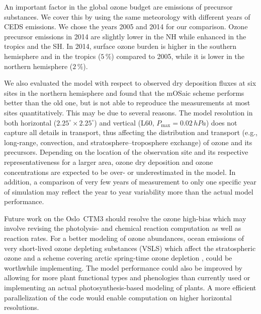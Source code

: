 \documentclass[gmd, manuscript]{copernicus}
\begin{document}

An important factor in the global ozone budget are emissions of precursor substances. We cover this by using the same meteorology with different years of CEDS emissions. We chose the years 2005 and 2014 for our comparison. Ozone precursor emissions in 2014 are slightly lower in the NH while enhanced in the tropics and the SH. In 2014, surface ozone burden is higher in the southern hemisphere and in the tropics ($5\,\unit{\%}$) compared to 2005, while it is lower in the northern hemisphere ($2\,\unit{\%}$).

We also evaluated the model with respect to observed dry deposition fluxes at six sites in the northern hemisphere and found that the mOSaic scheme performs better than the old one, but is not able to reproduce the measurements at most sites quantitatively. This may be due to several reasons. The model resolution in both horizontal ($2.25^\circ\times 2.25^\circ$) and vertical (L60, $P_\text{max}=0.02\,\unit{hPa}$) does not capture all details in transport, thus affecting the distribution and transport (e.g., long-range, convection, and stratosphere--troposphere exchange) of ozone and its precursors. Depending on the location of the observation site and its respective representativeness for a larger area, ozone dry deposition and ozone concentrations are expected to be over- or underestimated in the model. In addition, a comparison of very few years of measurement to only one specific year of simulation may reflect the year to year variability more than the actual model performance.

Future work on the Oslo~CTM3 should resolve the ozone high-bias which may involve revising the photolysis- and chemical reaction computation as well as reaction rates. For a better modeling of ozone abundances, ocean emissions of very short-lived ozone depleting substances (VSLS) \citep{JGR:Warwick2006, ACP:Ziska2013, ACP:Hossaini2016, ACP:Falk2017} which affect the stratospheric ozone and a scheme covering arctic spring-time ozone depletion \citep[e.g.,][]{ACP:Yang2010, ACP:Toyota2011, GMD:Falk2018}, could be worthwhile implementing. The model performance could also be improved by allowing for more plant functional types and phenologies than currently used or implementing an actual photosynthesis-based modeling of plants. A more efficient parallelization of the code would enable computation on higher horizontal resolutions.
\end{document}
